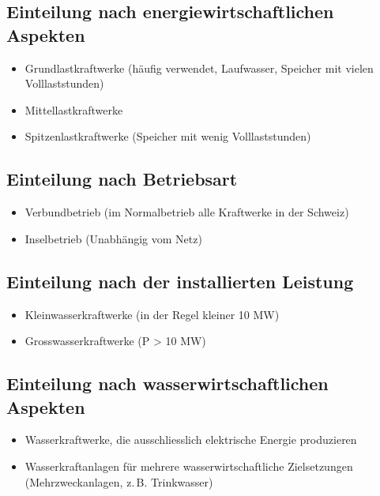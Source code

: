 \subsection{Einteilung nach energiewirtschaftlichen Aspekten}
\begin{itemize}
    \item Grundlastkraftwerke (häufig verwendet, Laufwasser, Speicher mit vielen Volllaststunden)
    \item Mittellastkraftwerke
    \item Spitzenlastkraftwerke (Speicher mit wenig Volllaststunden)
\end{itemize}



\subsection{Einteilung nach Betriebsart}
\begin{itemize}
    \item Verbundbetrieb (im Normalbetrieb alle Kraftwerke in der Schweiz)
    \item Inselbetrieb (Unabhängig vom Netz)
\end{itemize}



\subsection{Einteilung nach der installierten Leistung}
\begin{itemize}
    \item Kleinwasserkraftwerke (in der Regel kleiner 10 MW)
    \item Grosswasserkraftwerke (P > 10 MW)
\end{itemize}



\subsection{Einteilung nach wasserwirtschaftlichen Aspekten}
\begin{itemize}
    \item Wasserkraftwerke, die ausschliesslich elektrische Energie produzieren
    \item Wasserkraftanlagen für mehrere wasserwirtschaftliche Zielsetzungen (Mehrzweckanlagen, z.\,B. Trinkwasser)
\end{itemize}



